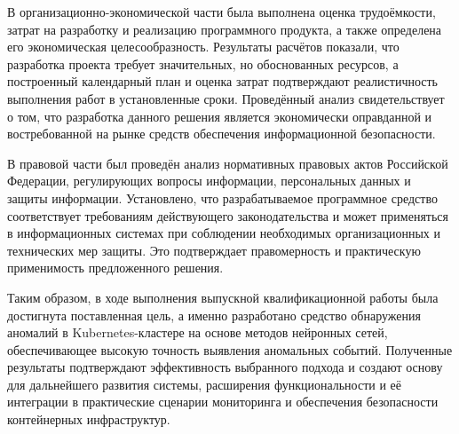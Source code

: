 В организационно-экономической части была выполнена оценка трудоёмкости, затрат на разработку и реализацию программного продукта, а также определена его экономическая целесообразность. Результаты расчётов показали, что разработка проекта требует значительных, но обоснованных ресурсов, а построенный календарный план и оценка затрат подтверждают реалистичность выполнения работ в установленные сроки. Проведённый анализ свидетельствует о том, что разработка данного решения является экономически оправданной и востребованной на рынке средств обеспечения информационной безопасности.

В правовой части был проведён анализ нормативных правовых актов Российской Федерации, регулирующих вопросы информации, персональных данных и защиты информации. Установлено, что разрабатываемое программное средство соответствует требованиям действующего законодательства и может применяться в информационных системах при соблюдении необходимых организационных и технических мер защиты. Это подтверждает правомерность и практическую применимость предложенного решения.

Таким образом, в ходе выполнения выпускной квалификационной работы была достигнута поставленная цель, а именно разработано средство обнаружения аномалий в Kubernetes-кластере на основе методов нейронных сетей, обеспечивающее высокую точность выявления аномальных событий. Полученные результаты подтверждают эффективность выбранного подхода и создают основу для дальнейшего развития системы, расширения функциональности и её интеграции в практические сценарии мониторинга и обеспечения безопасности контейнерных инфраструктур.
